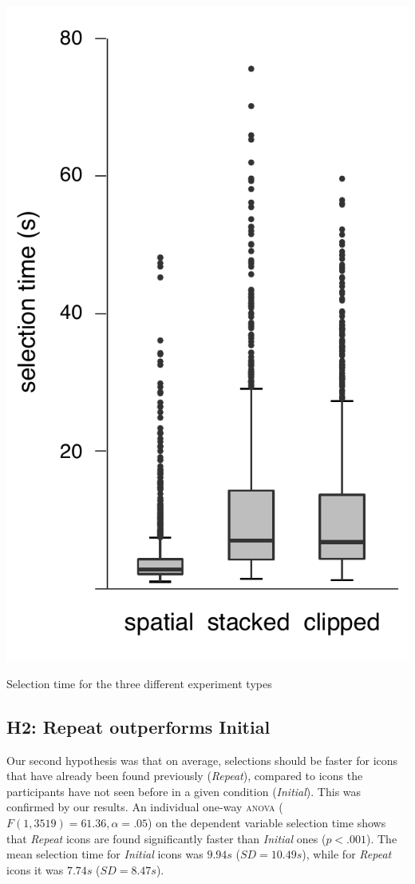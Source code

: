 \documentclass[nobib]{tufte-book} %
\begin{document}
\begin{marginfigure}
  \includegraphics[width=\linewidth]{duration-types.pdf}
  \caption{Selection time for the three different experiment types}
  \label{fig:duration-types}
\end{marginfigure}

\subsection{H2: Repeat outperforms Initial}
Our second hypothesis was that on average, selections should be faster for icons that have already been found previously (\emph{Repeat}), compared to icons the participants have not seen before in a given condition (\emph{Initial}). This was confirmed by our results. An individual one-way \textsc{anova} ($F(1,3519) = 61.36, \alpha = .05$) on the dependent variable selection time shows that \emph{Repeat} icons are found significantly faster than \emph{Initial} ones ($p < .001$). The mean selection time for \emph{Initial} icons was $9.94 s$ ($SD = 10.49 s$), while for \emph{Repeat} icons it was $7.74 s$ ($SD = 8.47 s$).
\end{document}
